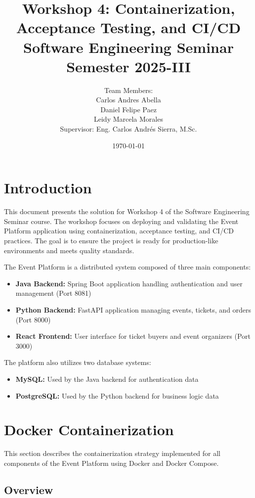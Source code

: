 \documentclass[12pt,a4paper]{article}
\title{Workshop 4: Containerization, Acceptance Testing, and CI/CD\\
\large Software Engineering Seminar\\
Semester 2025-III}
\author{Team Members:\\
Carlos Andres Abella\\
Daniel Felipe Paez\\
Leidy Marcela Morales\\
\vspace{0.5cm}
Supervisor: Eng. Carlos Andrés Sierra, M.Sc.}
\date{\today}
\begin{document}
\maketitle

\newpage
\tableofcontents
\newpage
\listoffigures
\newpage
\listoftables

\newpage

\section{Introduction}

This document presents the solution for Workshop 4 of the Software Engineering Seminar course. The workshop focuses on deploying and validating the Event Platform application using containerization, acceptance testing, and CI/CD practices. The goal is to ensure the project is ready for production-like environments and meets quality standards.

The Event Platform is a distributed system composed of three main components:
\begin{itemize}
    \item \textbf{Java Backend:} Spring Boot application handling authentication and user management (Port 8081)
    \item \textbf{Python Backend:} FastAPI application managing events, tickets, and orders (Port 8000)
    \item \textbf{React Frontend:} User interface for ticket buyers and event organizers (Port 3000)
\end{itemize}

The platform also utilizes two database systems:
\begin{itemize}
    \item \textbf{MySQL:} Used by the Java backend for authentication data
    \item \textbf{PostgreSQL:} Used by the Python backend for business logic data
\end{itemize}

\section{Docker Containerization}

This section describes the containerization strategy implemented for all components of the Event Platform using Docker and Docker Compose.

\subsection{Overview}
\end{document}
